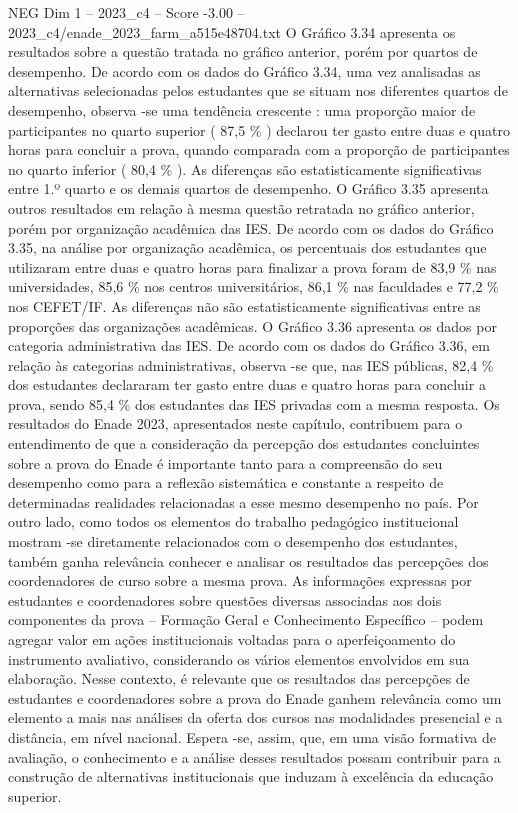 \begin{textsample}{NEG Dim 1 – 2023\_c4 – Score -3.00 – 2023\_c4/enade\_2023\_farm\_a515e48704.txt}
O Gráfico 3.34 apresenta os resultados sobre a questão tratada no gráfico anterior, porém por quartos de desempenho.
De acordo com os dados do Gráfico 3.34, uma vez analisadas as alternativas selecionadas pelos estudantes que se situam nos diferentes quartos de desempenho, observa -se uma tendência crescente : uma proporção maior de participantes no quarto superior ( 87,5 \% ) declarou ter gasto entre duas e quatro horas para concluir a prova, quando comparada com a proporção de participantes no quarto inferior ( 80,4 \% ).
As diferenças são estatisticamente significativas entre 1.º quarto e os demais quartos de desempenho.
O Gráfico 3.35 apresenta outros resultados em relação à mesma questão retratada no gráfico anterior, porém por organização acadêmica das IES.
De acordo com os dados do Gráfico 3.35, na análise por organização acadêmica, os percentuais dos estudantes que utilizaram entre duas e quatro horas para finalizar a prova foram de 83,9 \% nas universidades, 85,6 \% nos centros universitários, 86,1 \% nas faculdades e 77,2 \% nos CEFET/IF.
As diferenças não são estatisticamente significativas entre as proporções das organizações acadêmicas.
O Gráfico 3.36 apresenta os dados por categoria administrativa das IES.
De acordo com os dados do Gráfico 3.36, em relação às categorias administrativas, observa -se que, nas IES públicas, 82,4 \% dos estudantes declararam ter gasto entre duas e quatro horas para concluir a prova, sendo 85,4 \% dos estudantes das IES privadas com a mesma resposta.
Os resultados do Enade 2023, apresentados neste capítulo, contribuem para o entendimento de que a consideração da percepção dos estudantes concluintes sobre a prova do Enade é importante tanto para a compreensão do seu desempenho como para a reflexão sistemática e constante a respeito de determinadas realidades relacionadas a esse mesmo desempenho no país.
Por outro lado, como todos os elementos do trabalho pedagógico institucional mostram -se diretamente relacionados com o desempenho dos estudantes, também ganha relevância conhecer e analisar os resultados das percepções dos coordenadores de curso sobre a mesma prova.
As informações expressas por estudantes e coordenadores sobre questões diversas associadas aos dois componentes da prova – Formação Geral e Conhecimento Específico – podem agregar valor em ações institucionais voltadas para o aperfeiçoamento do instrumento avaliativo, considerando os vários elementos envolvidos em sua elaboração.
Nesse contexto, é relevante que os resultados das percepções de estudantes e coordenadores sobre a prova do Enade ganhem relevância como um elemento a mais nas análises da oferta dos cursos nas modalidades presencial e a distância, em nível nacional.
Espera -se, assim, que, em uma visão formativa de avaliação, o conhecimento e a análise desses resultados possam contribuir para a construção de alternativas institucionais que induzam à excelência da educação superior.

\end{textsample}
